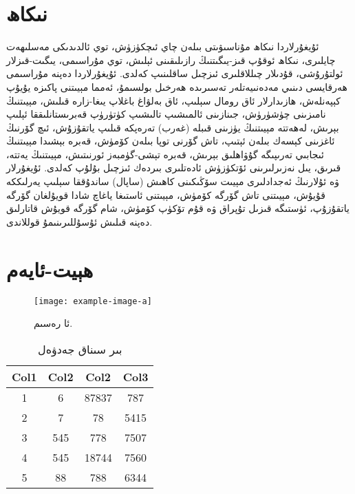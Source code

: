 \documentclass[a4paper]{book}
\begin{document}
\section{نىكاھ}
ئۇيغۇرلاردا نىكاھ مۇناسىۋىتى بىلەن چاي ئىچكۈزۈش، توي ئالدىدىكى مەسلىھەت چايلىرى، نىكاھ ئوقۇپ قىز-يىگىتنىڭ رازىلىقىنى ئېلىش، توي مۇراسىمى، يىگىت-قىزلار ئولتۇرۇشى، قۇدىلار چىللاقلىرى ئىزچىل ساقلىنىپ كەلدى. ئۇيغۇرلاردا دەپنە مۇراسىمى ھەرقايسى دىنىي مەدەنىيەتلەر تەسىرىدە ھەرخىل بولسىمۇ، ئەمما مېيىتنى پاكىزە يۇيۇپ كېپەنلەش، ھازىدارلار ئاق رومال سېلىپ، ئاق بەلۋاغ باغلاپ يىغا-زارە قىلىش، مېيىتنىڭ نامىزىنى چۈشۈرۈش، جىنازىنى ئالمىشىپ تالىشىپ كۈتۈرۈپ قەبرىستانلىققا ئېلىپ بېرىش، لەھەتتە مېيىتنىڭ يۈزىنى قىبلە (غەرب) تەرەپكە قىلىپ ياتقۇزۇش، ئىچ گۆرنىڭ ئاغزىنى كېسەك بىلەن ئېتىپ، تاش گۆرنى توپا بىلەن كۆمۈش، قەبرە بېشىدا مېيىتنىڭ ئىجابىي تەرىپىگە گۇۋاھلىق بېرىش، قەبرە تېشى-گۈمبەز ئورنىتىش، مېيىتنىڭ يەتتە، قىرىق، يىل نەزىرلىرىنى ئۆتكۈزۈش ئادەتلىرى بىردەك ئىزچىل بۇلۇپ كەلدى. ئۇيغۇرلار ۋە ئۇلارنىڭ ئەجدادلىرى مېيىت سۆڭىكىنى كاھىش (ساپال) ساندۇققا سېلىپ يەرلىككە قۇيۇش، مېيىتنى تاش گۆرگە كۆمۈش، مېيىتنى ئاستىغا ياغاچ شادا قويۇلغان گۆرگە ياتقۇزۇپ، ئۈستىگە قىزىل تۇپراق ۋە قۇم تۆكۈپ كۆمۈش، شام گۆرگە قويۇش قاتارلىق دەپنە قىلىش ئۇسۇللىرىنىمۇ قوللاندى. 

\section{ھېيت-ئايەم}


\begin{figure}
	\begin{center}
\texttt{[image: example-image-a]}
\caption{ئا رەسىم.}
	\end{center}
\end{figure}

\begin{table}
\begin{center}
	\begin{tabular}{||c c c c||} 
		\hline
		Col1 & Col2 & Col2 & Col3 \\ [0.5ex] 
		\hline\hline
		1 & 6 & 87837 & 787 \\ 
		\hline
		2 & 7 & 78 & 5415 \\
		\hline
		3 & 545 & 778 & 7507 \\
		\hline
		4 & 545 & 18744 & 7560 \\
		\hline
		5 & 88 & 788 & 6344 \\ [1ex] 
		\hline
	\end{tabular}
	\caption{بىر سىناق جەدۋەل}
\end{center}
\end{table}
\end{document}
